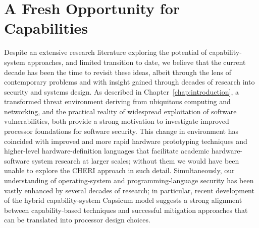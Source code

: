 \section{A Fresh Opportunity for Capabilities} %

Despite an extensive research literature exploring the potential of
capability-system approaches, and limited transition to date, we believe
that the current decade has been the time to revisit these
ideas, albeit through the lens of contemporary problems and with insight gained through decades of research into security and systems design.
As described in Chapter~\ref{chap:introduction}, a transformed threat
environment deriving from ubiquitous computing and networking, and the
practical reality of  widespread exploitation of software vulnerabilities, 
both
provide a strong motivation to investigate improved processor foundations for
software security.
This change in environment has coincided with improved 
and more rapid
hardware prototyping
techniques and higher-level hardware-definition languages that facilitate
academic hardware-software system research at larger scales; without them we
would have been unable to explore the CHERI approach in such detail.
Simultaneously, our understanding of operating-system and programming-language
security has been vastly enhanced by several decades of research; 
in particular, recent
development of the hybrid capability-system Capsicum model suggests a strong alignment between
capability-based techniques and successful mitigation approaches that can be
translated into processor design choices.


